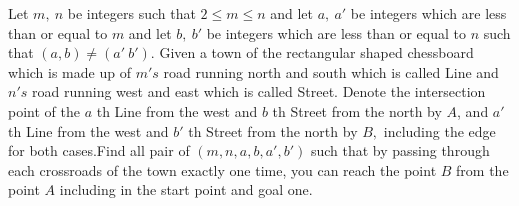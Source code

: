 Let $m,\ n$ be integers such that $2\leq m\leq n$ and let $a,\ a'$ be integers which are less than or equal to $m$ and let $b,\ b'$ be integers which are less than or equal to $n$ such that $(a,b)\neq (a'\ b').$ Given a town of the rectangular shaped chessboard which is made up of $m's$ road running north and south which is called Line and $n's$ road running west and east which is called Street. Denote the intersection point of the $a$ th Line from the west and $b$ th Street from the north by $A$, and $a'$ th Line from the west and $b'$ th Street from the north by $B,$ including the edge for both cases.Find all pair of $(m,n,a,b,a', b')$ such that by passing through each crossroads of the town exactly one time, you can reach the point $B$ from the point $A$ including in the start point and goal one.